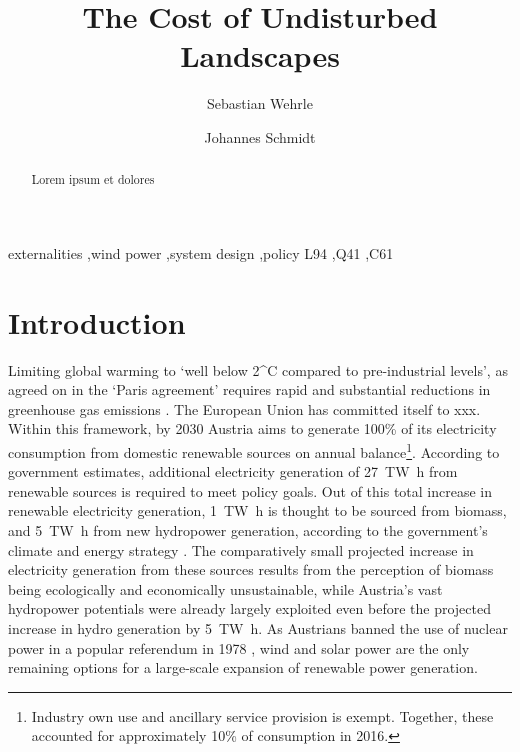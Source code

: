 \documentclass[review, 3p, times]{elsarticle} %
\begin{document}
    \begin{frontmatter}
        \title{The Cost of Undisturbed Landscapes}
        \author[1]{Sebastian Wehrle}
        \author[1]{Johannes Schmidt}
        \address[1]{Institute for Sustainable Economic Development, University of Natural Resources and Life Sciences,
        Feistmantelstrasse 4, 1180 Vienna, Austria}

        \begin{abstract}
            Lorem ipsum et dolores
        \end{abstract}

        \begin{keyword}
            externalities \sep wind power \sep system design \sep policy
            \JEL L94 \sep Q41 \sep C61
        \end{keyword}
    \end{frontmatter}
    \newpage



    \section{Introduction} \label{sec:introduction}
    Limiting global warming to `well below 2^{\circ}C compared to pre-industrial levels', as agreed on in the `Paris
    agreement' requires rapid and substantial reductions in greenhouse gas emissions \citep{IPCC2019}.
    The European Union has committed itself to xxx.
    Within this framework, by 2030 Austria aims to generate 100\% of its electricity consumption from domestic renewable
    sources on annual balance\footnote{Industry own use and ancillary service provision is exempt.
    Together, these accounted for approximately 10\% of consumption in 2016.}.
    According to government estimates, additional electricity generation of \SI{27}{\tera\watt\hour} from renewable
    sources is required to meet policy goals.
    Out of this total increase in renewable electricity generation, \SI{1}{\tera\watt\hour} is thought to be sourced
    from biomass, and \SI{5}{\tera\watt\hour} from new hydropower generation, according to the government's climate and
    energy strategy \citep{BMNT2018}.
    The comparatively small projected increase in electricity generation from these sources results from the perception
    of biomass being ecologically \citep{Erb2018} and economically unsustainable, while Austria's vast hydropower
    potentials were already largely exploited \citep{Walder2014} even before the projected increase in hydro generation
    by \SI{5}{\tera\watt\hour}.
    As Austrians banned the use of nuclear power in a popular referendum in 1978 \citep{Pelinka1983}, wind and solar
    power are the only remaining options for a large-scale expansion of renewable power generation.
\end{document}
